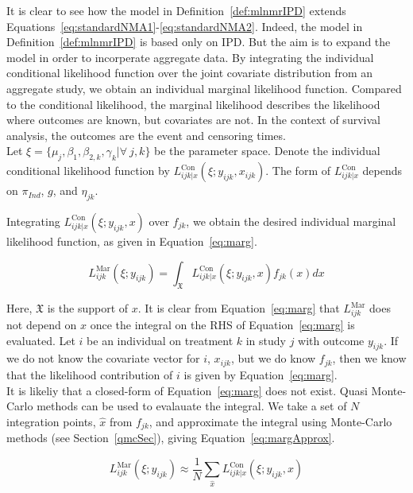 It is clear to see how the model in Definition~\ref{def:mlnmrIPD} extends Equations~\ref{eq:standardNMA1}-\ref{eq:standardNMA2}.  Indeed, the model in Definition~\ref{def:mlnmrIPD} is based only on IPD. But the aim is to expand the model in order to incorperate aggregate data. By integrating the individual conditional likelihood function over the joint covariate distribution from an aggregate study, we obtain an individual marginal likelihood function. Compared to the conditional likelihood, the marginal likelihood describes the likelihood where outcomes are known, but covariates are not. In the context of survival analysis, the outcomes are the event and censoring times. \\

Let $\xi = \{\mu_j, \beta_1, \beta_{2,k}, \gamma_k | \forall \ j,k \}$ be the parameter space. Denote the individual conditional likelihood function by $L_{ijk|x}^{\text{Con}}(\xi; y_{ijk}, x_{ijk})$. The form of $L_{ijk|x}^{\text{Con}}$ depends on $\pi_{Ind}$, $g$, and $\eta_{jk}$.

Integrating $L_{ijk|x}^{\text{Con}}(\xi; y_{ijk}, x)$ over $f_{jk}$, we obtain the desired individual marginal likelihood function, as given in Equation~\ref{eq:marg}. 

\begin{equation}
    L_{ijk}^{\text{Mar}}(\xi; y_{ijk}) = \int_{\mathfrak{X}} L_{ijk|x}^{\text{Con}}(\xi; y_{ijk}, x)f_{jk}(x)dx
    \label{eq:marg}
\end{equation}

Here, $\mathfrak{X}$ is the support of $x$. It is clear from Equation~\ref{eq:marg} that $L_{ijk}^{\text{Mar}}$ does not depend on $x$ once the integral on the RHS of Equation~\ref{eq:marg} is evaluated. Let $i$ be an individual on treatment $k$ in study $j$ with outcome $y_{ijk}$. If we do not know the covariate vector for $i$, $x_{ijk}$, but we do know $f_{jk}$, then we know that the likelihood contribution of $i$ is given by Equation~\ref{eq:marg}. \\

It is likeliy that a closed-form of Equation~\ref{eq:marg} does not exist. Quasi Monte-Carlo methods can be used to evalauate the integral. We take a set of $N$ integration points, $\hat{x}$ from $f_{jk}$, and approximate the integral using Monte-Carlo methods (see Section~\ref{qmcSec}), giving Equation~\ref{eq:margApprox}.

\begin{equation}
    L_{ijk}^{\text{Mar}}(\xi; y_{ijk}) \approx \frac{1}{N}\sum_{\hat{x}}L_{ijk|x}^{\text{Con}}(\xi;y_{ijk},x)
    \label{eq:margApprox}
\end{equation}

